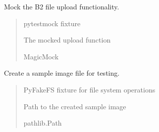\documentclass[letterpaper,10pt,openany,oneside,english]{sphinxmanual}
\begin{document}
\begin{savenotes}\begin{fulllineitems}
\label{\detokenize{modules/tests:storeapi.tests.routers.test_upload.mock_b2_upload_file}}
\pysigstartsignatures
{}
\pysigstopsignatures
\sphinxAtStartPar
Mock the B2 file upload functionality.
\begin{quote}\begin{description}
\sphinxAtStartPar
{} \textendash{} pytest\sphinxhyphen{}mock fixture

\sphinxAtStartPar
The mocked upload function

\sphinxAtStartPar
MagicMock

\end{description}\end{quote}

\end{fulllineitems}\end{savenotes}


\begin{savenotes}\begin{fulllineitems}
\label{\detokenize{modules/tests:storeapi.tests.routers.test_upload.sample_image}}
\pysigstartsignatures
{}
\pysigstopsignatures
\sphinxAtStartPar
Create a sample image file for testing.
\begin{quote}\begin{description}
\sphinxAtStartPar
{} \textendash{} PyFakeFS fixture for file system operations

\sphinxAtStartPar
Path to the created sample image

\sphinxAtStartPar
pathlib.Path

\end{description}\end{quote}

\end{fulllineitems}\end{savenotes}
\end{document}
